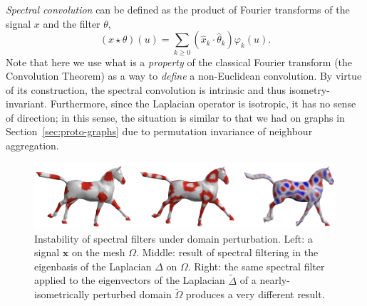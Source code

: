 {\em Spectral convolution} can be defined as the product of Fourier transforms of the signal $x$ and the filter $\theta$, 
\begin{equation}
(x \star \theta)(u) = 
\sum_{k \geq 0} (\hat{x}_k \cdot \hat{\theta}_k ) \varphi_k (u).
\label{eqn:conv_spectral}
\end{equation}
%
Note that here we use what is a {\em property} of the classical Fourier transform (the Convolution Theorem) as a way to {\em define} a non-Euclidean convolution.
%
By virtue of its construction, the spectral convolution is intrinsic and thus isometry-invariant. 
%
Furthermore, since the Laplacian operator is isotropic, it has no sense of direction; in this sense, the situation is similar to that we had on graphs in Section~\ref{sec:proto-graphs} due to permutation invariance of neighbour aggregation. 







\begin{figure}[h!]
    \centering
    \includegraphics[width=\linewidth]{figures/horses.png}
    \caption{Instability of spectral filters under domain perturbation. Left: a signal $\mathbf{x}$ on the mesh $\Omega$. Middle: result of spectral filtering %
    in the eigenbasis %
    of the Laplacian $\Delta$ on $\Omega$. 
    Right: 
    the same spectral filter %
    applied to the eigenvectors %
    of the Laplacian $\tilde{\Delta}$ of a nearly-isometrically perturbed domain $\tilde{\Omega}$ 
    produces a very different result. 
    }
    \label{fig:mesh_horses}
\end{figure}%




